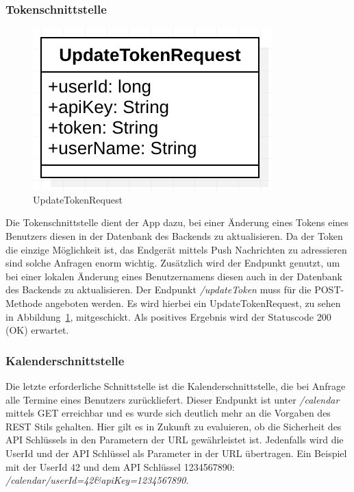 \subsubsection{Tokenschnittstelle}
\begin{figure}[h]
	\centering
	\includegraphics{include/img/updatetokenrequest}
	\caption{UpdateTokenRequest}
	\label{fig:updateTokenRequest}
\end{figure}
Die Tokenschnittstelle dient der App dazu, bei einer Änderung eines Tokens eines Benutzers diesen in der Datenbank des Backends zu aktualisieren. Da der Token die einzige Möglichkeit ist, das Endgerät mittels Push Nachrichten zu adressieren sind solche Anfragen enorm wichtig. Zusätzlich wird der Endpunkt genutzt, um bei einer lokalen Änderung eines Benutzernamens diesen auch in der Datenbank des Backends zu aktualisieren. Der Endpunkt \textit{/updateToken} muss für die POST-Methode angeboten werden. Es wird hierbei ein UpdateTokenRequest, zu sehen in Abbildung~\ref{fig:updateTokenRequest}, mitgeschickt. Als positives Ergebnis wird der Statuscode 200 (OK) erwartet.

\subsubsection{Kalenderschnittstelle}
Die letzte erforderliche Schnittstelle ist die Kalenderschnittstelle, die bei Anfrage alle Termine eines Benutzers zurückliefert. Dieser Endpunkt ist unter \textit{/calendar} mittels GET erreichbar und es wurde sich deutlich mehr an die Vorgaben des REST Stils gehalten. Hier gilt es in Zukunft zu evaluieren, ob die Sicherheit des API Schlüssels in den Parametern der URL gewährleistet ist. Jedenfalls wird die UserId und der API Schlüssel als Parameter in der URL übertragen. Ein Beispiel mit der UserId 42 und dem API Schlüssel 1234567890: \textit{/calendar/userId=42\&apiKey=1234567890}.

